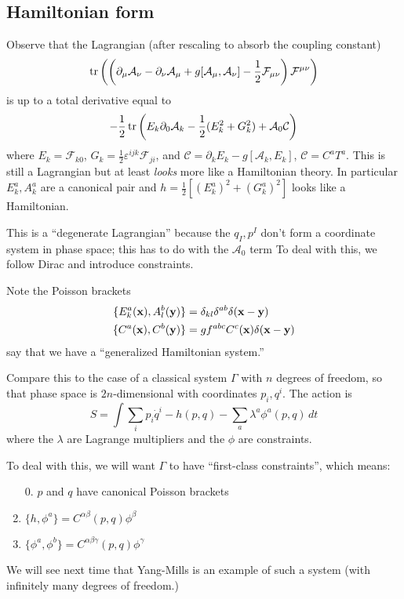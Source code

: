 \subsection*{Hamiltonian form}
Observe that the Lagrangian (after rescaling to absorb the coupling constant)
\[
\operatorname{tr} \left( \left( \partial_\mu \mathcal A_\nu - \partial_\nu \mathcal A_\mu + g[\mathcal{A}_\mu , \mathcal A_\nu] - \frac{1}{2} \mathcal F_{\mu \nu}  \right) \mathcal F^{\mu \nu} \right)
\]
is up to a total derivative equal to 
\[
- \frac{1}{2} \operatorname{tr} \left( E_k \partial_0 \mathcal A_k - \frac{1}{2} (E_k^2 + G_k^2) + \mathcal A_0 \mathcal C\right)
\]
where $E_k = \mathcal F_{k0}$, $G_k = \frac{1}{2} \varepsilon^{ijk} \mathcal F_{ji}$, and $\mathcal C = \partial_k E_k - g[\mathcal A_k, E_k]$, $\mathcal C = C^a T^a$.
This is still a Lagrangian but at least \emph{looks} more like a Hamiltonian theory.
In particular $E_k^a, A_k^a$ are a canonical pair and $h = \frac{1}{2}[ (E_k^a)^2 + (G_k^a)^2]$ looks like a Hamiltonian.

This is a ``degenerate Lagrangian'' because the $q_I, p^I$ don't form a coordinate system in phase space; this has to do with the $\mathcal A_0$ term 
To deal with this, we follow Dirac and introduce constraints.

Note the Poisson brackets
\begin{align*}
\{ E_k^a(\mathbf{x}), A_l^b(\mathbf{y})\} &= \delta_{kl} \delta^{ab} \delta(\mathbf{x} - \mathbf{y})\\
\{C^a(\mathbf{x}), C^b(\mathbf{y})\} &= g f^{abc} C^c(\mathbf{x}) \delta(\mathbf{x} - \mathbf{y})
\end{align*}
say that we have a ``generalized Hamiltonian system.''

Compare this to the case of a classical system $\Gamma$ with $n$ degrees of freedom, so that phase space is $2n$-dimensional with coordinates $p_i, q^i$.
The action is
\[
S = \int \sum_i p_i \dot q^i - h(p,q) - \sum_a \lambda^a \phi^a(p,q) \, dt
\]
where the $\lambda$ are Lagrange multipliers and the $\phi$ are constraints.

To deal with this, we will want $\Gamma$ to have ``first-class constraints'', which means:
\begin{enumerate}
    \item[0.]  $p$ and $q$ have canonical Poisson brackets
    \item $\{h, \phi^a\} = C^{\alpha \beta} (p,q) \phi^\beta$ 
    \item $\{\phi^a, \phi^b\} = C^{\alpha \beta \gamma} (p,q) \phi^\gamma$
\end{enumerate}
We will see next time that Yang-Mills is an example of such a system (with infinitely many degrees of freedom.)